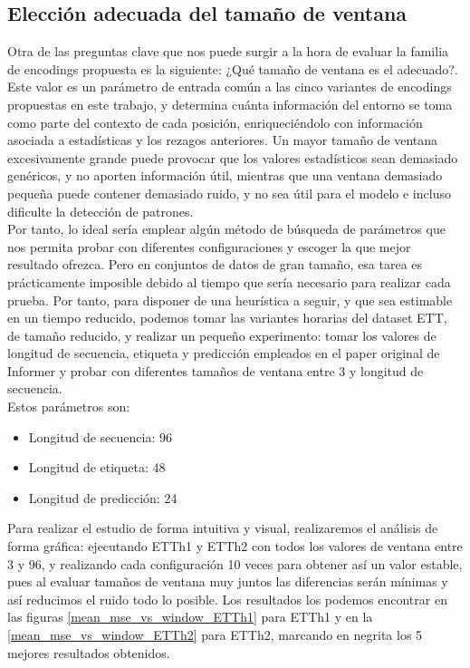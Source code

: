 \subsection{Elección adecuada del tamaño de ventana}

Otra de las preguntas clave que nos puede surgir a la hora de evaluar la familia de encodings propuesta es la siguiente: ¿Qué tamaño de ventana es el adecuado?.\\

Este valor es un parámetro de entrada común a las cinco variantes de encodings propuestas en este trabajo, y determina cuánta información del entorno se toma como parte del contexto de cada posición, enriqueciéndolo con información asociada a estadísticas y los rezagos anteriores. Un mayor tamaño de ventana excesivamente grande puede provocar que los valores estadísticos sean demasiado genéricos, y no aporten información útil, mientras que una ventana demasiado pequeña puede contener demasiado ruido, y no sea útil para el modelo e incluso dificulte la detección de patrones.\\

Por tanto, lo ideal sería emplear algún método de búsqueda de parámetros que nos permita probar con diferentes configuraciones y escoger la que mejor resultado ofrezca. Pero en conjuntos de datos de gran tamaño, esa tarea es prácticamente imposible debido al tiempo que sería necesario para realizar cada prueba. Por tanto, para disponer de una heurística a seguir, y que sea estimable en un tiempo reducido, podemos tomar las variantes horarias del dataset ETT, de tamaño reducido, y realizar un pequeño experimento: tomar los valores de longitud de secuencia, etiqueta y predicción empleados en el paper original de Informer y probar con diferentes tamaños de ventana entre 3 y longitud de secuencia.\\

Estos parámetros son:

\begin{itemize}
	\item Longitud de secuencia: 96
	\item Longitud de etiqueta: 48
	\item Longitud de predicción: 24
\end{itemize}

Para realizar el estudio de forma intuitiva y visual, realizaremos el análisis de forma gráfica: ejecutando ETTh1 y ETTh2 con todos los valores de ventana entre 3 y 96, y realizando cada configuración 10 veces para obtener así un valor estable, pues al evaluar tamaños de ventana muy juntos las diferencias serán mínimas y así reducimos el ruido todo lo posible. Los resultados los podemos encontrar en las figuras \ref{mean_mse_vs_window_ETTh1} para ETTh1 y en la \ref{mean_mse_vs_window_ETTh2} para ETTh2, marcando en negrita los 5 mejores resultados obtenidos.\\


